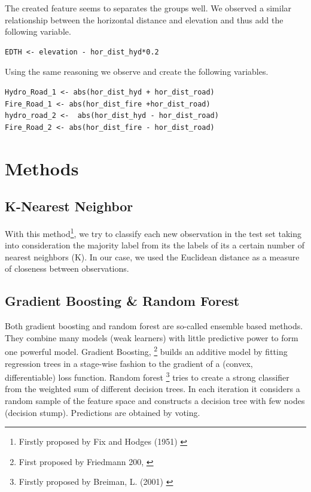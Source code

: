 \documentclass[paper=a4, fontsize=11pt]{scrartcl}
\numberwithin{equation}{section}
\numberwithin{figure}{section}
\numberwithin{table}{section}
\begin{document}
The created feature seems to separates the groups well. We observed a similar relationship between the horizontal distance and elevation and thus add the following variable.\\

\begin{lstlisting}
EDTH <- elevation - hor_dist_hyd*0.2
\end{lstlisting}

Using the same reasoning we observe and create the following variables.
\begin{lstlisting}
Hydro_Road_1 <- abs(hor_dist_hyd + hor_dist_road)
Fire_Road_1 <- abs(hor_dist_fire +hor_dist_road)
hydro_road_2 <-  abs(hor_dist_hyd - hor_dist_road)
Fire_Road_2 <- abs(hor_dist_fire - hor_dist_road)
\end{lstlisting}



\section{Methods}

\subsection{K-Nearest Neighbor}
With this method\footnote{Firstly proposed by Fix and Hodges (1951) \cite{knn}}, we try to classify each new observation in the test set taking into consideration the majority label from its the labels of its a certain number of nearest neighbors (K). In our case, we used the Euclidean distance as a measure of closeness between observations.

\subsection{Gradient Boosting  \& Random Forest}
Both gradient boosting and random forest are so-called ensemble based methods. They combine many models (weak learners) with little predictive power to form one powerful model. 
Gradient Boosting,  \footnote{First proposed by Friedmann 200, \cite{Friedman00greedyfunction}} builds an additive model by fitting regression trees in a stage-wise fashion to the gradient of a (convex, differentiable) loss function.
Random forest \footnote{Firstly proposed by Breiman, L. (2001) \cite{random} } tries to create a strong classifier from the weighted sum of different decision trees. In each iteration it considers a random sample of the feature space and constructs a  decision tree with few nodes (decision stump). Predictions are obtained by voting. 
\end{document}
